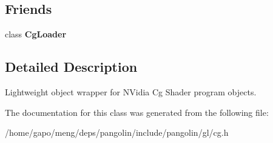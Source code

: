 \subsection*{Friends}
\begin{DoxyCompactItemize}
\item 
class {\bfseries Cg\+Loader}\hypertarget{classpangolin_1_1_cg_program_a01a9f1198be9776655a9dfab0cfc9f44}{}\label{classpangolin_1_1_cg_program_a01a9f1198be9776655a9dfab0cfc9f44}

\end{DoxyCompactItemize}


\subsection{Detailed Description}
Lightweight object wrapper for N\+Vidia Cg Shader program objects. 

The documentation for this class was generated from the following file\+:\begin{DoxyCompactItemize}
\item 
/home/gapo/meng/deps/pangolin/include/pangolin/gl/cg.\+h\end{DoxyCompactItemize}
